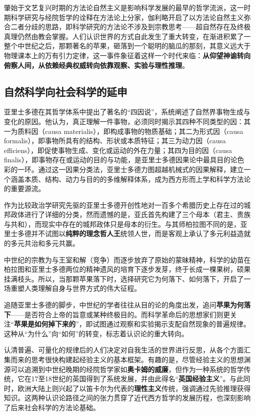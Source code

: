 肇始于文艺复兴时期的方法论自然主义是影响科学发展的最早的哲学流派，这一时期科学研究与经院哲学的诠释在方法论上分家，伽利略开启了以方法论自然主义弥合二者分歧的思路，即科学研究的方法论不涉及到宗教思考------超自然存在及终极真理仍然由教会掌握。人们认识世界的方式自此发生了重大转变，在渐进积累了一整个中世纪之后，那颗著名的苹果，砸落到一个聪明的脑瓜的那刻，其意义远大于物理课本上的万有引力定律，这一事件象征着这样一个时代来临：\textbf{从仰望神谕转向俯察人间，从依赖经典权威转向依靠观察、实验与理性推理}。

\subsection{自然科学向社会科学的延申}

亚里士多德在其哲学体系中提出了著名的“四因说”，系统阐述了自然界事物生成与变化的原因。他认为，真正理解一件事物，必须同时揭示其四种不同类型的因：其一为质料因（causa materialis），即构成事物的物质基础；其二为形式因（causa formalis），即事物所具有的结构、形状或本质特征；其三为动力因（causa efficiens），即促使事物生成、变化或运动的外在力量；其四为目的因（causa finalis），即事物存在或运动的目的与功能，是亚里士多德因果论中最具目的论色彩的一环。通过这一因果分类法，亚里士多德力图超越机械式的因果解释，建立一个涵盖本质、结构、动力与目的的多维解释体系，成为西方形而上学和科学方法论的重要源流。

作为比较政治学研究先驱的亚里士多德开创性地对一百多个希腊历史上存在过的城邦政体进行了详细的分类，然而遗憾的是，亚氏首先构建了三个母本（君主、贵族与共和），而现实中存在的城邦政体只是母本的衍生。与其师柏拉图不同的是，亚里士多德并不试图以\textbf{纯粹的理念哲人王}统领人世，而是客观上承认了多元利益造就的多元共治和多元共赢。

中世纪的宗教为与王室和解（竞争）而逐步放弃了原始的蒙昧精神，科学的幼苗在柏拉图和亚里士多德两位的精神遗风的培育下逐步发芽，终于长成一棵果树，硕果挂满枝头。所以，当那颗苹果落下时，选择研究它为何落下、如何落下，开启了一场重塑人类理解自身与世界方式的伟大征程。

追随亚里士多德的脚步，中世纪的学者往往从目的论的角度出发，追问\textbf{苹果为何落下}------是否符合上帝的旨意或某种终极目的。而科学革命后的思想家们则更关注“\textbf{苹果是如何掉下来的}”，即试图通过观察和实验揭示支配自然现象的普遍规律。这种从“为什么”向“如何”的转变，标志着认识论的重大转向。

认清普遍、可量化的规律后的人们决定对自我生活的世界进行反思，从各个方面汇集而来的思考很快构建起经验主义的基本框架。有趣的是，尽管经验主义的思想渊源可以追溯到中世纪晚期的经院哲学家如\textbf{奥卡姆的威廉}，但作为一种系统的哲学传统，它在17至18世纪的英国得到了系统发展，并由此得名“\textbf{英国经验主义}”。与此同时，欧洲大陆上则兴起了以笛卡尔为代表的\textbf{理性主义}传统，强调通过先验推理获得知识。这两种认识论路径之间的张力贯穿了近代西方哲学的发展历程，也深刻影响了后来社会科学的方法论基础。


